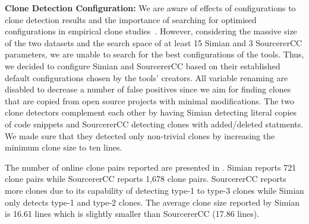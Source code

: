 \documentclass[10pt,journal,compsoc]{IEEEtran}
\begin{document}
\textbf{Clone Detection Configuration: } We are aware of effects of
configurations to clone detection results and the importance of searching for
optimised configurations in empirical clone
studies~\cite{Svajlenko2014,Wang2014,cr2016ssbse,Ragkhitwetsagul2016}. However,
considering the massive size of the two datasets and the search space of at
least 15 Simian and 3 SourcererCC parameters, we are unable to search for the
best configurations of the tools. Thus, we decided to configure Simian and
SourcererCC based on their established default configurations chosen by the
tools' creators. All variable renaming are disabled to decrease a number of
false positives since we aim for finding clones that are copied from open source
projects with minimal modifications. The two clone detectors complement each
other by having Simian detecting literal copies of code snippets and SourcererCC
detecting clones with added/deleted statments. We made sure that they 
detected only non-trivial clones by increasing the minimum clone size to ten
lines.


The number of online clone pairs reported %
are presented in . Simian reports 721 clone
pairs while SourcererCC reports 1,678 clone pairs. 
SourcererCC reports more clones due to its capability of detecting
type-1 to type-3 clones while Simian only detects type-1 and type-2 clones.
The average clone size reported by Simian is
16.61 lines which is slightly smaller than SourcererCC (17.86 lines).
\end{document}
